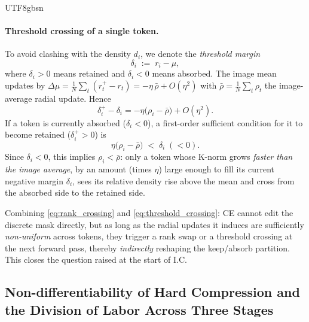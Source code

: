 \documentclass[10pt,twocolumn,letterpaper]{article}
\begin{document}
\begin{CJK}{UTF8}{gbsn}
\paragraph{Threshold crossing of a single token.}
To avoid clashing with the density $d_i$, we denote the \emph{threshold margin}
\begin{equation}
    \delta_i \;:=\; r_i-\mu,
\end{equation}
where $\delta_i>0$ means retained and $\delta_i<0$ means absorbed. The image mean
updates by $\Delta\mu=\frac1N\sum_t(r_t^+-r_t)=-\eta\,\bar\rho+O(\eta^2)$ with
$\bar\rho=\frac1N\sum_t\rho_t$ the image-average radial update. Hence
\begin{equation}
    \delta_i^+-\delta_i
    =-\eta\bigl(\rho_i-\bar\rho\bigr)+O(\eta^2).
    \label{eq:threshold_margin}
\end{equation}
If a token is currently absorbed ($\delta_i<0$), a first-order sufficient
condition for it to become retained ($\delta_i^+>0$) is
\begin{equation}
    \eta\bigl(\rho_i-\bar\rho\bigr)\;<\;\delta_i\;(<0).
    \label{eq:threshold_crossing}
\end{equation}
Since $\delta_i<0$, this implies $\rho_i<\bar\rho$: only a token whose K-norm
grows \emph{faster than the image average}, by an amount (times $\eta$) large
enough to fill its current negative margin $\delta_i$, sees its relative density
rise above the mean and cross from the absorbed side to the retained side.

Combining \eqref{eq:rank_crossing} and \eqref{eq:threshold_crossing}: CE cannot
edit the discrete mask directly, but as long as the radial updates it induces are
sufficiently \emph{non-uniform} across tokens, they trigger a rank swap or a
threshold crossing at the next forward pass, thereby \emph{indirectly} reshaping
the keep/absorb partition. This closes the question raised at the start of I.C.

\subsection{Non-differentiability of Hard Compression and the Division of Labor Across Three Stages}


\end{CJK}
\end{document}
